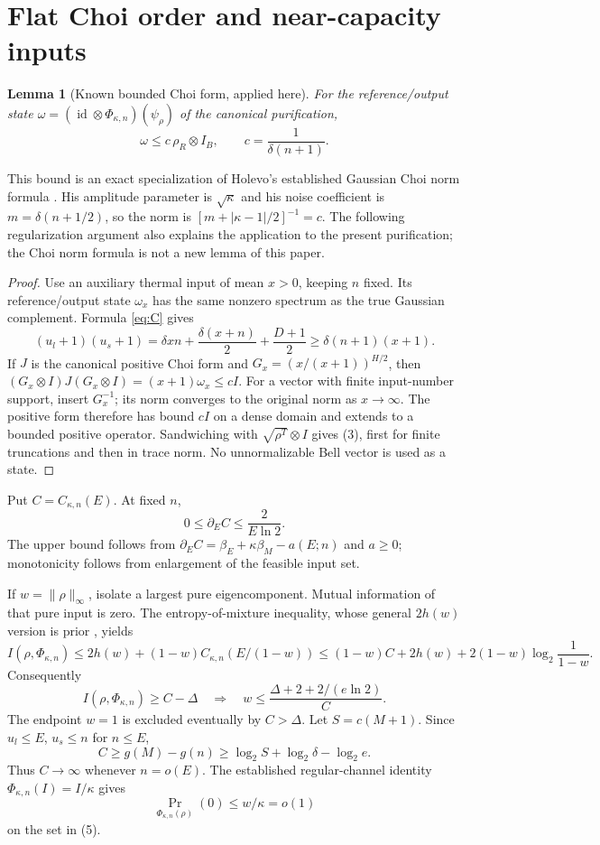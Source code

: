 \documentclass[11pt]{article}
\newtheorem{lemma}[theorem]{Lemma}
\newcommand{\id}{\operatorname{id}}
\newcommand{\PhiT}{\Phi_{\kappa,n}}
\begin{document}
\section{Flat Choi order and near-capacity inputs}
\begin{lemma}[Known bounded Choi form, applied here]\label{lem:flat}
For the reference/output state
\(\omega=(\id\otimes\PhiT)(\psi_\rho)\) of the canonical purification,
\[
 \omega\le c\,\rho_R\otimes I_B,\qquad
 c=\frac1{\delta(n+1)}.                                      \tag{3}
\]
\end{lemma}
This bound is an exact specialization of Holevo's established Gaussian
Choi norm formula \cite[Proposition~2 and the one-mode example, p.~13]{choi}.
His amplitude parameter is \(\sqrt\kappa\) and his noise coefficient is
\(m=\delta(n+1/2)\), so the norm is
\([m+|\kappa-1|/2]^{-1}=c\). The following regularization argument
also explains the application to the present purification; the Choi
norm formula is not a new lemma of this paper.
\begin{proof}
Use an auxiliary thermal input of mean \(x>0\), keeping \(n\) fixed.
Its reference/output state \(\omega_x\) has the same nonzero spectrum as
the true Gaussian complement. Formula \eqref{eq:C} gives
\[
 (u_l+1)(u_s+1)
 =\delta xn+\frac{\delta(x+n)}2+\frac{D+1}2
 \ge\delta(n+1)(x+1).
\]
If \(J\) is the canonical positive Choi form and
\(G_x=(x/(x+1))^{H/2}\), then
\((G_x\otimes I)J(G_x\otimes I)=(x+1)\omega_x\le cI\).
For a vector with finite input-number support, insert \(G_x^{-1}\);
its norm converges to the original norm as \(x\to\infty\).
The positive form therefore has bound \(cI\) on a dense domain and
extends to a bounded positive operator. Sandwiching with
\(\sqrt{\rho^T}\otimes I\) gives (3), first for finite truncations and
then in trace norm. No unnormalizable Bell vector is used as a state.
\end{proof}

Put \(C=C_{\kappa,n}(E)\). At fixed \(n\),
\[
 0\le\partial_E C\le\frac2{E\ln2}.                            \tag{4}
\]
The upper bound follows from
\(\partial_E C=\beta_E+\kappa\beta_M-a(E;n)\) and \(a\ge0\);
monotonicity follows from enlargement of the feasible input set.

If \(w=\|\rho\|_\infty\), isolate a largest pure eigencomponent.
Mutual information of that pure input is zero. The entropy-of-mixture
inequality, whose general \(2h(w)\) version is prior
\cite[Eq.~(11), Section~5.2]{shirokov}, yields
\[
 I(\rho,\PhiT)\le2h(w)+(1-w)C_{\kappa,n}(E/(1-w))
 \le(1-w)C+2h(w)+2(1-w)\log_2\frac1{1-w}.
\]
Consequently
\[
 I(\rho,\PhiT)\ge C-\Delta
 \quad\Longrightarrow\quad
 w\le\frac{\Delta+2+2/(e\ln2)}C.                              \tag{5}
\]
The endpoint \(w=1\) is excluded eventually by \(C>\Delta\).
Let \(S=c(M+1)\). Since \(u_l\le E\), \(u_s\le n\) for \(n\le E\),
\[
 C\ge g(M)-g(n)\ge\log_2 S+\log_2\delta-\log_2 e.
 \tag{6}
\]
Thus \(C\to\infty\) whenever \(n=o(E)\).
The established regular-channel identity \(\PhiT(I)=I/\kappa\)
\cite[Proposition~2]{gain} gives
\[
 \Pr_{\PhiT(\rho)}(0)\le w/\kappa=o(1)                       \tag{7}
\]
on the set in (5).
\end{document}
